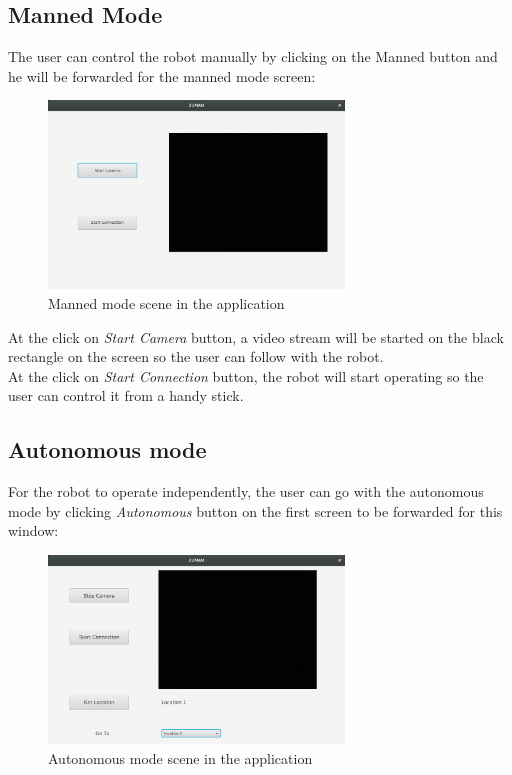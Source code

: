 \documentclass[12pt]{article}
\begin{document}
\subsection{Manned Mode}
The user can control the robot manually by clicking on the Manned button and he will be forwarded for the manned mode screen:

\begin{figure}[H]
	\centering
	\includegraphics[width =0.7\textwidth]{Fig/manned-mode.png}
	\caption{Manned mode scene in the application}
	\label{fig:manned-mode}
\end{figure}

\noindent At the click on \textit{Start Camera} button, a video stream will be started on the black rectangle on the screen so the user can follow with the robot.\\
At the click on \textit{Start Connection} button, the robot will start operating so the user can control it from a
handy stick.

\subsection{Autonomous mode}
For the robot to operate independently, the user can go with the autonomous mode by clicking \textit{Autonomous} button on the first screen to be forwarded for this window:

\begin{figure}[H]
	\centering
	\includegraphics[width =0.7\textwidth]{Fig/auto-mode.png}
	\caption{Autonomous mode scene in the application}
	\label{fig:auto-mode}
\end{figure}
\end{document}
